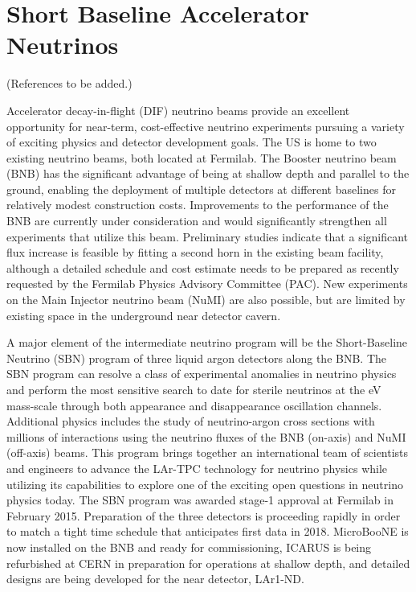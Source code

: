\section{Short Baseline Accelerator Neutrinos}
\label{sec:AcceleratorSB}

(References to be added.) 

Accelerator decay-in-flight (DIF) neutrino beams provide an excellent opportunity for near-term, cost-effective neutrino experiments pursuing a variety of exciting physics and detector development goals.  The US is home to two existing neutrino beams, both located at Fermilab.  The Booster neutrino beam (BNB) has the significant advantage of being at shallow depth and parallel to the ground, enabling the deployment of multiple detectors at different baselines for relatively modest construction costs.  Improvements to the performance of the BNB are currently under consideration and would significantly strengthen all experiments that utilize this beam.  Preliminary studies indicate that a significant flux increase is feasible by fitting a second horn in the existing beam facility, although a detailed schedule and cost estimate needs to be prepared as recently requested by the Fermilab Physics Advisory Committee (PAC). New experiments on the Main Injector neutrino beam (NuMI) are also possible, but are limited by existing space in the underground near detector cavern.

A major element of the intermediate neutrino program will be the Short-Baseline Neutrino (SBN) program of three liquid argon detectors along the BNB.  The SBN program can resolve a class of experimental anomalies in neutrino physics and perform the most sensitive search to date for sterile neutrinos at the eV mass-scale through both appearance and disappearance oscillation channels. Additional physics includes the study of neutrino-argon cross sections with millions of interactions using the neutrino fluxes of the BNB (on-axis) and NuMI (off-axis) beams.  This program brings together an international team of scientists and engineers to advance the LAr-TPC technology for neutrino physics while utilizing its capabilities to explore one of the exciting open questions in neutrino physics today.  The SBN program was awarded stage-1 approval at Fermilab in February 2015.   Preparation of the three detectors is proceeding rapidly in order to match a tight time schedule that anticipates first data in 2018.  MicroBooNE is now installed on the BNB and  ready for commissioning, ICARUS is being refurbished at CERN in preparation for operations at shallow depth, and detailed designs are being developed for the near detector, LAr1-ND.

